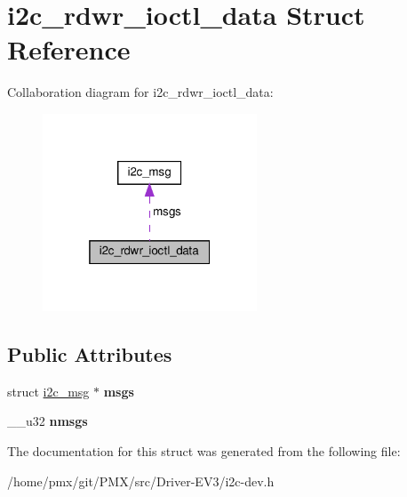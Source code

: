 \hypertarget{structi2c__rdwr__ioctl__data}{}\section{i2c\+\_\+rdwr\+\_\+ioctl\+\_\+data Struct Reference}
\label{structi2c__rdwr__ioctl__data}


Collaboration diagram for i2c\+\_\+rdwr\+\_\+ioctl\+\_\+data\+:
\nopagebreak
\begin{figure}[H]
\begin{center}
\leavevmode
\includegraphics[width=181pt]{structi2c__rdwr__ioctl__data__coll__graph}
\end{center}
\end{figure}
\subsection*{Public Attributes}
\begin{DoxyCompactItemize}
\item 
\mbox{\label{structi2c__rdwr__ioctl__data_a436bb0f35544ff79b2c0ac3570f5b7f0}} 
struct \hyperlink{structi2c__msg}{i2c\+\_\+msg} $\ast$ {\bfseries msgs}
\item 
\mbox{\label{structi2c__rdwr__ioctl__data_aab635d05b219aba0508889f7f23170e3}} 
\+\_\+\+\_\+u32 {\bfseries nmsgs}
\end{DoxyCompactItemize}


The documentation for this struct was generated from the following file\+:\begin{DoxyCompactItemize}
\item 
/home/pmx/git/\+P\+M\+X/src/\+Driver-\/\+E\+V3/i2c-\/dev.\+h\end{DoxyCompactItemize}

